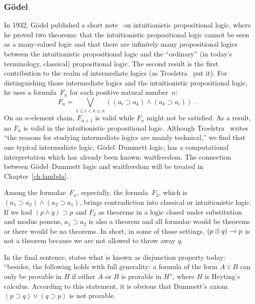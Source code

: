 \subsubsection{G\"odel}
In 1932, G\"odel published a short note~\cite{godelprop} on
intuitionistic propositional
logic, where he proved two theorems: that the intuitionistic propositional logic
cannot be seen as a many-valued logic and that
there are infinitely many propositional logics between the
intuitionistic propositional logic and the ``ordinary'' (in today's
terminology, classical) propositional logic.  The second result is the
first contribution to the realm of intermediate
logics (as
Troelstra~\cite[p.~223]{goedelcollected} put it).
For distinguishing those intermediate logics and the intuitionistic
propositional logic, he uses a formula~$F_n$ for each positive natural
number~$n$:
\[
 F_n = \bigvee_{1\le i < k\le n}\left((a_i\supset a_k) \land (a_k\supset a_i)\right)\enspace.
\]
On an $n$-element chain, $F_{n+1}$ is valid while $F_n$ might not be
satisfied.  As a result, no $F_n$ is valid in the intuitionistic
propositional logic.
Although Troelstra~\cite[p.~223]{goedelcollected} writes ``the reasons
for studying intermediate logics are mainly technical,'' we find that
one typical intermediate logic, G\"odel--Dummett logic, has a
computational interpretation which has already been known: waitfreedom.
The connection between G\"odel--Dummett logic and waitfreedom will be
treated in Chapter~\ref{ch:lambda}.

Among the formulae~$F_n$,
especially, the formula~$F_2$, which is $(a_1\supset a_2)\land (a_2\supset
a_1)$, brings contradiction into classical or intuitionistic logic.  If we
had $(p\land q)\supset p$ and $F_2$ as theorems in a logic closed under
substitution and modus ponens,
$a_1\supset a_2$ is also a theorem and all formulae would be theorems or
there would be no theorems.
In short, in some of those settings, $(p\otimes q)\multimap p$ is
not a theorem because we are not allowed to throw away $q$.

In the final sentence, \citet{godelprop} states what is known as
disjunction property today: ``besides, the
following holds with full
generality: a formula of the form $A\lor B$ can only be provable in $H$
if either $A$ or $B$ is provable in $H$'', where $H$ is Heyting's calculus.
According to this statement, it is obvious that Dummett's axiom
$(p\supset q) \lor (q\supset p)$ is not provable.

